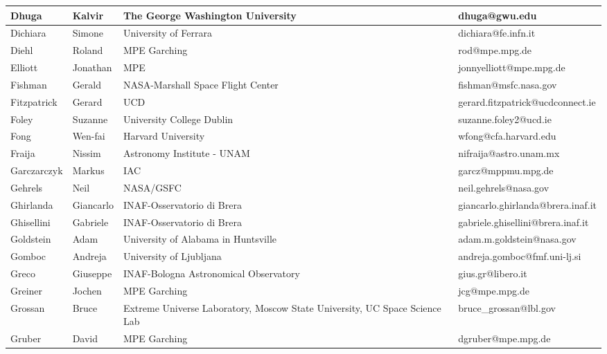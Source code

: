 \begin{center}
\begin{longtable}{|p{1.28cm} |p{1.28cm} |p{2.9cm} |p{3cm} |}
\tiny Dhuga &\tiny Kalvir & \tiny The George Washington University & \tiny dhuga@gwu.edu \\ \hline
\tiny Dichiara &\tiny Simone & \tiny University of Ferrara & \tiny dichiara@fe.infn.it \\ \hline
\tiny Diehl &\tiny Roland & \tiny MPE Garching & \tiny rod@mpe.mpg.de \\ \hline
\tiny Elliott &\tiny Jonathan & \tiny MPE & \tiny jonnyelliott@mpe.mpg.de \\ \hline
\tiny Fishman &\tiny Gerald & \tiny NASA-Marshall Space Flight Center & \tiny fishman@msfc.nasa.gov \\ \hline
\tiny Fitzpatrick &\tiny Gerard & \tiny UCD & \tiny gerard.fitzpatrick@ucdconnect.ie \\ \hline
\tiny Foley &\tiny Suzanne & \tiny University College Dublin & \tiny suzanne.foley2@ucd.ie \\ \hline
\tiny Fong &\tiny Wen-fai & \tiny Harvard University & \tiny wfong@cfa.harvard.edu \\ \hline
\tiny Fraija &\tiny Nissim & \tiny Astronomy Institute - UNAM & \tiny nifraija@astro.unam.mx \\ \hline
\tiny Garczarczyk &\tiny Markus & \tiny IAC & \tiny garcz@mppmu.mpg.de \\ \hline
\tiny Gehrels &\tiny Neil & \tiny NASA/GSFC & \tiny neil.gehrels@nasa.gov \\ \hline
\tiny Ghirlanda &\tiny Giancarlo & \tiny INAF-Osservatorio di Brera & \tiny giancarlo.ghirlanda@brera.inaf.it \\ \hline
\tiny Ghisellini &\tiny Gabriele & \tiny INAF-Osservatorio di Brera & \tiny gabriele.ghisellini@brera.inaf.it \\ \hline
\tiny Goldstein &\tiny Adam & \tiny University of Alabama in Huntsville & \tiny adam.m.goldstein@nasa.gov \\ \hline
\tiny Gomboc &\tiny Andreja & \tiny University of Ljubljana & \tiny andreja.gomboc@fmf.uni-lj.si \\ \hline
\tiny Greco &\tiny Giuseppe & \tiny INAF-Bologna Astronomical Observatory & \tiny gius.gr@libero.it \\ \hline
\tiny Greiner &\tiny Jochen & \tiny MPE Garching & \tiny jcg@mpe.mpg.de \\ \hline
\tiny Grossan &\tiny Bruce & \tiny Extreme Universe Laboratory, Moscow State University, UC Space Science Lab & \tiny bruce\_grossan@lbl.gov \\ \hline
\tiny Gruber &\tiny David & \tiny MPE Garching & \tiny dgruber@mpe.mpg.de \\ \hline

\end{longtable}
\end{center}
